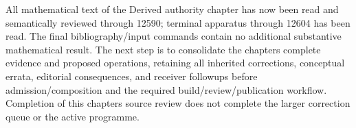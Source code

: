 All mathematical text of the Derived authority chapter has now been read and semantically reviewed through 12590; terminal apparatus through 12604 has been read. The final bibliography/\allowbreak{}input commands contain no additional substantive mathematical result. The next step is to consolidate the chapter\textquotesingle s complete evidence and proposed operations,\allowbreak{} retaining all inherited corrections,\allowbreak{} conceptual errata,\allowbreak{} editorial consequences,\allowbreak{} and receiver followups before admission/\allowbreak{}composition and the required build/\allowbreak{}review/\allowbreak{}publication workflow. Completion of this chapter\textquotesingle s source review does not complete the larger correction queue or the active programme.
